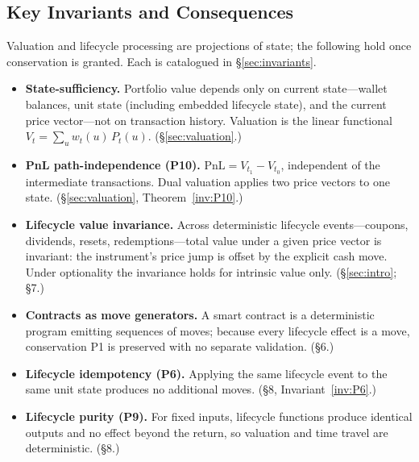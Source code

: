 \subsection*{Key Invariants and Consequences}

Valuation and lifecycle processing are projections of state; the following hold once
conservation is granted. Each is catalogued in \S\ref{sec:invariants}.

\begin{itemize}[nosep]
\item \textbf{State-sufficiency.} Portfolio value depends only on current state---wallet
balances, unit state (including embedded lifecycle state), and the current price
vector---not on transaction history. Valuation is the linear functional
$V_t=\sum_u w_t(u)\,P_t(u)$. (\S\ref{sec:valuation}.)
\item \textbf{PnL path-independence (P10).} $\mathrm{PnL}=V_{t_1}-V_{t_0}$, independent of
the intermediate transactions. Dual valuation applies two price vectors to one state.
(\S\ref{sec:valuation}, Theorem~\ref{inv:P10}.)
\item \textbf{Lifecycle value invariance.} Across deterministic lifecycle
events---coupons, dividends, resets, redemptions---total value under a given price vector
is invariant: the instrument's price jump is offset by the explicit cash move. Under
optionality the invariance holds for intrinsic value only. (\S\ref{sec:intro}; \S7.)
\item \textbf{Contracts as move generators.} A smart contract is a deterministic program
emitting sequences of moves; because every lifecycle effect is a move, conservation P1 is
preserved with no separate validation. (\S6.)
\item \textbf{Lifecycle idempotency (P6).} Applying the same lifecycle event to the same
unit state produces no additional moves. (\S8, Invariant~\ref{inv:P6}.)
\item \textbf{Lifecycle purity (P9).} For fixed inputs, lifecycle functions produce
identical outputs and no effect beyond the return, so valuation and time travel are
deterministic. (\S8.)
\end{itemize}
